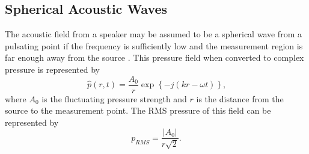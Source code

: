 \subsection{Spherical Acoustic Waves}
\label{sect:03_examples_spherical}
The acoustic field from a speaker may be assumed to be a spherical wave from a pulsating point if the frequency is sufficiently low and the measurement region is far enough away from the source \cite{Randall-1951-9NtPPXPq}.
This pressure field when converted to complex pressure is represented by
\begin{equation}
  \hat{p}(r,t) = \frac{A_0}{r}\exp\left\{-j(kr-\omega t)\right\} \textrm{,}
  \label{eqn:03_spherical_pressure}
\end{equation}
where $A_0$ is the fluctuating pressure strength and $r$ is the distance from the source to the measurement point.
The RMS pressure of this field can be represented by
\begin{equation}
  p_{RMS} = \frac{|A_0|}{r\sqrt{2}} \textrm{.}
  \label{eqn:03_spherical_pressure_rms}
\end{equation}

